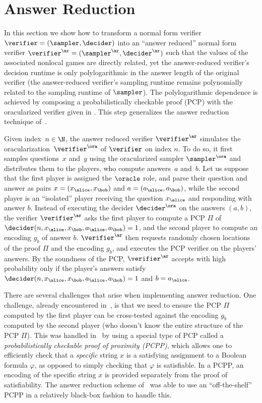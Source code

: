 \section{Answer Reduction}
\label{sec:ans}

In this section we show how to transform a normal form verifier $\verifier =
(\sampler, \decider)$ into an ``answer reduced'' normal form verifier
$\verifier^\ar = (\sampler^\ar, \decider^\ar)$ such that the values of the
associated nonlocal games are directly related, yet the answer-reduced
verifier's decision runtime is only polylogarithmic in the answer length of the
original verifier (the answer-reduced verifier's sampling runtime remains
polynomially related to the sampling runtime of $\sampler$).
The polylogarithmic dependence is achieved by composing a probabilistically
checkable proof (PCP) with the oracularized verifier given in .
This step generalizes the answer reduction technique of~\cite[Part V]{NW19}.

Given index~$n \in \N$, the answer reduced verifier $\verifier^\ar$ simulates
the oracularization~$\verifier^\ora$ of $\verifier$ on index $n$.
To do so, it first samples questions~$x$ and~$y$ using the oracularized sampler
$\sampler^\ora$ and distributes them to the players, who compute answers~$a$
and~$b$.
Let us suppose that the first player is assigned the $\oracle$ role, and parse
their question and answer as pairs $x = (x_\alice, x_\bob)$ and $a = (a_\alice,
a_\bob)$, while the second player is an ``isolated'' player receiving the
question $x_\alice$ and responding with answer $b$.
Instead of executing the decider $\decider^\ora$ on the answers $(a, b)$, the
verifier $\verifier^\ar$ asks the first player to compute a PCP $\Pi$ of
$\decider(n, x_\alice, x_\bob, a_\alice, a_\bob) = 1$, and the second player to
compute an encoding $g_b$ of answer $b$.
$\verifier^\ar$ then requests randomly chosen locations of the proof $\Pi$ and
the encoding $g_b$, and executes the PCP verifier on the players' answers.
By the soundness of the PCP, $\verifier^\ar$ accepts with high probability only
if the player's answers satisfy $\decider(n, x_\alice, x_\bob, a_\alice, a_\bob)
= 1$ and $b = a_\alice$.

There are several challenges that arise when implementing answer reduction.
One challenge, already encountered in~\cite{NW19}, is that we need to ensure the
PCP $\Pi$ computed by the first player can be cross-tested against the encoding
$g_b$ computed by the second player (who doesn't know the entire structure of
the PCP $\Pi$).
This was handled in~\cite{NW19} by using a special type of PCP called a
\emph{probabilistically checkable proof of proximity (PCPP)}, which allows one
to efficiently check that a \emph{specific} string $x$ is a satisfying
assignment to a Boolean formula $\varphi$, as opposed to simply checking that
$\varphi$ is satisfiable.
In a PCPP, an encoding of the specific string $x$ is provided separately from
the proof of satisfiability.
The answer reduction scheme of~\cite{NW19} was able to use an ``off-the-shelf''
PCPP in a relatively black-box fashion to handle this.

